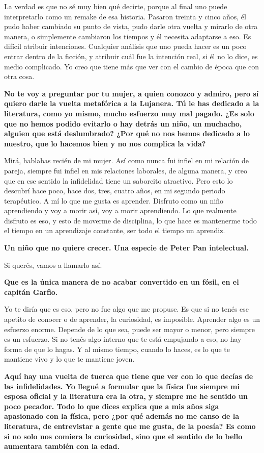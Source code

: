 \documentclass[11pt,a4paper]{article}
\newcommand{\preg}[1]{\textbf{#1}}
\begin{document}
La verdad es que no sé muy bien qué decirte, porque al final uno puede interpretarlo como un remake de esa historia. Pasaron treinta y cinco años, él pudo haber cambiado su punto de vista, pudo darle otra vuelta y mirarlo de otra manera, o simplemente cambiaron los tiempos y él necesita adaptarse a eso. Es difícil atribuir intenciones. Cualquier análisis que uno pueda hacer es un poco entrar dentro de la ficción, y atribuir cuál fue la intención real, si él no lo dice, es medio complicado. Yo creo que tiene más que ver con el cambio de época que con otra cosa.

\preg{No te voy a preguntar por tu mujer, a quien conozco y admiro, pero sí quiero darle la vuelta metafórica a la Lujanera. Tú le has dedicado a la literatura, como yo mismo, mucho esfuerzo muy mal pagado. ¿Es solo que no hemos podido evitarlo o hay detrás un niño, un muchacho, alguien que está deslumbrado? ¿Por qué no nos hemos dedicado a lo nuestro, que lo hacemos bien y no nos complica la vida?}

Mirá, hablabas recién de mi mujer. Así como nunca fui infiel en mi relación de pareja, siempre fui infiel en mis relaciones laborales, de alguna manera, y creo que en ese sentido la infidelidad tiene un saborcito atractivo. Pero esto lo descubrí hace poco, hace dos, tres, cuatro años, en mi segundo periodo terapéutico. A mí lo que me gusta es aprender. Disfruto como un niño aprendiendo y voy a morir así, voy a morir aprendiendo. Lo que realmente disfruto es eso, y esto de moverme de disciplina, lo que hace es mantenerme todo el tiempo en un aprendizaje constante, ser todo el tiempo un aprendiz.

\preg{Un niño que no quiere crecer. Una especie de Peter Pan intelectual.}

Si querés, vamos a llamarlo así.

\preg{Que es la única manera de no acabar convertido en un fósil, en el capitán Garfio.}

Yo te diría que es eso, pero no fue algo que me propuse. Es que si no tenés ese apetito de conocer o de aprender, la curiosidad, es imposible. Aprender algo es un esfuerzo enorme. Depende de lo que sea, puede ser mayor o menor, pero siempre es un esfuerzo. Si no tenés algo interno que te está empujando a eso, no hay forma de que lo hagas. Y al mismo tiempo, cuando lo haces, es lo que te mantiene vivo y lo que te mantiene joven.

\preg{Aquí hay una vuelta de tuerca que tiene que ver con lo que decías de las infidelidades. Yo llegué a formular que la física fue siempre mi esposa oficial y la literatura era la otra, y siempre me he sentido un poco pecador. Todo lo que dices explica que a mis años siga apasionado con la física, pero ¿por qué además no me canso de la literatura, de entrevistar a gente que me gusta, de la poesía? Es como si no solo nos comiera la curiosidad, sino que el sentido de lo bello aumentara también con la edad.}
\end{document}
